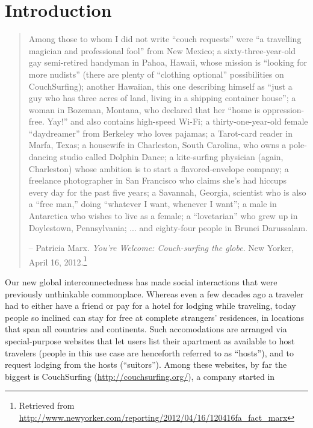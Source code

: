 \section{Introduction}

\begin{quotation}
Among those to whom I did not write “couch requests” were “a travelling magician and professional fool” from New Mexico; a sixty-three-year-old gay semi-retired handyman in Pahoa, Hawaii, whose mission is “looking for more nudists” (there are plenty of “clothing optional” possibilities on CouchSurfing); another Hawaiian, this one describing himself as “just a guy who has three acres of land, living in a shipping container house”; a woman in Bozeman, Montana, who declared that her “home is oppression-free. Yay!” and also contains high-speed Wi-Fi; a thirty-one-year-old female “daydreamer” from Berkeley who loves pajamas; a Tarot-card reader in Marfa, Texas; a housewife in Charleston, South Carolina, who owns a pole-dancing studio called Dolphin Dance; a kite-surfing physician (again, Charleston) whose ambition is to start a flavored-envelope company; a freelance photographer in San Francisco who claims she’s had hiccups every day for the past five years; a Savannah, Georgia, scientist who is also a “free man,” doing “whatever I want, whenever I want”; a male in Antarctica who wishes to live as a female; a “lovetarian” who grew up in Doylestown, Pennsylvania; ... and eighty-four people in Brunei Darussalam.

-- Patricia Marx. \emph{You're Welcome: Couch-surfing the globe}. New Yorker, April 16, 2012.\footnote{Retrieved from \url{http://www.newyorker.com/reporting/2012/04/16/120416fa_fact_marx}}
\end{quotation}

Our new global interconnectedness has made social interactions that were previously unthinkable commonplace.
Whereas even a few decades ago a traveler had to either have a friend or pay for a hotel for lodging while traveling, today people so inclined can stay for free at complete strangers' residences, in locations that span all countries and continents.
Such accomodations are arranged via special-purpose websites that let users list their apartment as available to host travelers (people in this use case are henceforth referred to as ``hosts''), and to request lodging from the hosts (``suitors'').
Among these websites, by far the biggest is CouchSurfing (\url{http://couchsurfing.org/}), a company started in 

